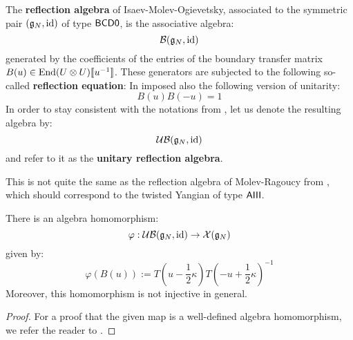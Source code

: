             \begin{definition} \label{def: IMO_reflection_algebras}
                The \textbf{reflection algebra} of Isaev-Molev-Ogievetsky, associated to the symmetric pair $(\mathfrak{g}_N, \mathrm{id})$ of type $\mathsf{B}\mathsf{C}\mathsf{D}\mathsf{0}$, is the associative algebra:
                    $$\mathcal{B}(\mathfrak{g}_N, \mathrm{id})$$
                generated by the coefficients of the entries of the boundary transfer matrix $B(u) \in \End(U \tensor U)[\![u^{-1}]\!]$. These generators are subjected to the following so-called \textbf{reflection equation}:
                In \cite{isaev_molev_ogievetsky_fusion_for_brauer_algebras_2} imposed also the following version of unitarity:
                    $$B(u) B(-u) = 1$$
                In order to stay consistent with the notations from \cite{guay_regelskis_twisted_yangians_for_symmetric_pairs_of_types_BCD}, let us denote the resulting algebra by:
                    $$\mathcal{UB}(\mathfrak{g}_N, \mathrm{id})$$
                and refer to it as the \textbf{unitary reflection algebra}.
            \end{definition}
            \begin{remark}
                This is not quite the same as the reflection algebra of Molev-Ragoucy from \cite{molev_ragoucy_representations_of_reflection_algebras}, which should correspond to the twisted Yangian of type $\mathsf{A} \mathsf{III}$.
            \end{remark}

            \begin{proposition} \label{prop: mapping_IMO_reflection_algebras_to_extended_yangians}
                There is an algebra homomorphism:
                    \begin{equation} \label{equation: mapping_IMO_reflection_algebras_to_extended_yangians}
                        \varphi: \mathcal{UB}(\mathfrak{g}_N, \mathrm{id}) \to \mathcal{X}(\mathfrak{g}_N)
                    \end{equation}
                given by:
                    $$\varphi(B(u)) := T\left(u - \frac12 \kappa\right) T\left(-u + \frac12 \kappa\right)^{-1}$$
                Moreover, this homomorphism is not injective in general.
            \end{proposition}
                \begin{proof}
                    For a proof that the given map is a well-defined algebra homomorphism, we refer the reader to \cite[Proposition 3.2]{isaev_molev_ogievetsky_fusion_for_brauer_algebras_2}. 
                \end{proof}

